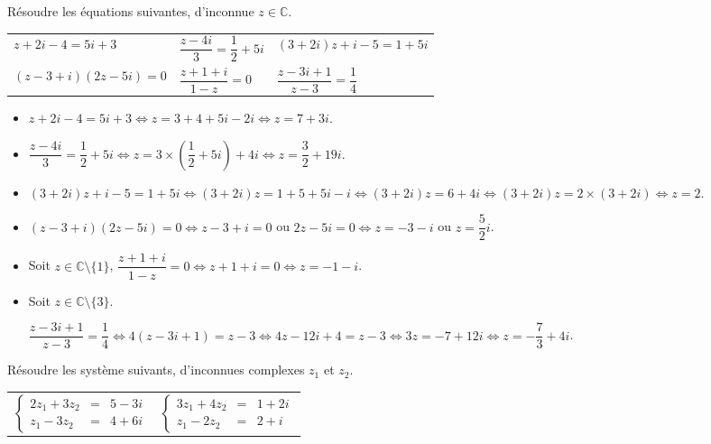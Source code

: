 \documentclass[11pt,fleqn, openany]{book} %
\begin{document}
\begin{exercise}[topic=cpx01]Résoudre les équations suivantes, d'inconnue $z\in\mathbb{C}$.

\renewcommand{\arraystretch}{2}
\begin{tabularx}{\linewidth}{XXX}
$z+2i-4=5i+3$ & $\dfrac{z-4i}{3}=\dfrac{1}{2}+5i$ & $(3+2i)z+i-5=1+5i$ \\
$(z-3+i)(2z-5i)=0$ & $\dfrac{z+1+i}{1-z}=0$ & $\dfrac{z-3i+1}{z-3}=\dfrac{1}{4}$

\end{tabularx}
\vspace{-1cm}\end{exercise}

\begin{solution}
\begin{itemize}
\item \(z+2i-4=5i+3 \Leftrightarrow z = 3+4+5i-2i \Leftrightarrow z = 7+3i\).
\item \(\dfrac{z-4i}{3}=\dfrac{1}{2}+5i \Leftrightarrow z = 3 \times \left(\dfrac{1}{2}+5i\right)+4i \Leftrightarrow z = \dfrac{3}{2}+19i\).
\item \((3+2i)z+i-5=1+5i \Leftrightarrow (3+2i)z = 1+5+5i-i \Leftrightarrow (3+2i)z = 6+4i \Leftrightarrow (3+2i)z = 2\times (3+2i) \Leftrightarrow z = 2\).
\item \((z-3+i)(2z-5i)=0 \Leftrightarrow z-3+i=0\) ou \(2z-5i=0 \Leftrightarrow z = -3-i\) ou \(z= \dfrac{5}{2}i\).
\item Soit \(z\in\mathbb{C}\setminus \{1\}\),
\(\dfrac{z+1+i}{1-z}=0 \Leftrightarrow z+1+i = 0 \Leftrightarrow z=-1-i\).
\item Soit \(z \in \mathbb{C}\setminus \{3\}\).

\(\dfrac{z-3i+1}{z-3}=\dfrac{1}{4} \Leftrightarrow 4(z-3i+1)=z-3 \Leftrightarrow 4z-12i+4=z-3 \Leftrightarrow 3z = -7+12i \Leftrightarrow z = -\dfrac{7}{3}+4i\).
\end{itemize}
\end{solution}

\begin{exercise}[topic=cpx01]Résoudre les système suivants, d'inconnues complexes $z_1$ et $z_2$.


\begin{tabularx}{\linewidth}{XX}$\left\{\begin{array}{rcl}
2z_1+3z_2 &=& 5-3i\\
z_1-3z_2&=&4+6i\end{array}\right.$ & $\left\{\begin{array}{rcl}
3z_1+4z_2 &=& 1+2i\\
z_1-2z_2&=&2+i\end{array}\right.$ \end{tabularx}
\vspace{-0.5cm}\end{exercise}
\end{document}
